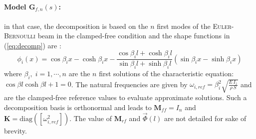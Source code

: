 \documentclass[smallcondensed]{svjour3}     %
\begin{document}
\paragraph{Model $\mathbf{G}_{f,n}(s)$:} in that case, the decomposition is based on the $n$ first modes of the \textsc{Euler-Bernoulli} beam in the clamped-free condition and the shape functions in (\ref{eq:decomp}) are \cite{wiki,bishop1979mechanics}:
\begin{equation}\label{eq:phiref}
\phi_i(x)=\cos\beta_i x-\cosh\beta_i x-\frac{\cos\beta_i l+\cosh\beta_i l}{\sin\beta_i l+\sinh\beta_i l}(\sin\beta_i x-\sinh\beta_i x)
\end{equation}
where $\beta_i,\;i=1,\cdots,n$ are the $n$ first solutions of the  characteristic equation:\\ $\cos\beta l\cosh\beta l+1=0$. The natural frequencies are given by $\omega_{i,ref}=\beta_i^2\sqrt{\frac{E\,I_z}{\rho\,S}}$ and are the clamped-free reference values to evaluate approximate solutions. Such a decomposition basis is orthonormal and leads to $\mathbf{M}_{ff}=I_n$ and $\mathbf{K}=\mbox{diag}([\omega_{i,ref}^2])$. The value of $\mathbf{M}_{rf}$ and $\vec{\Phi}(l)$ are not detailed for sake of brevity.
\end{document}
